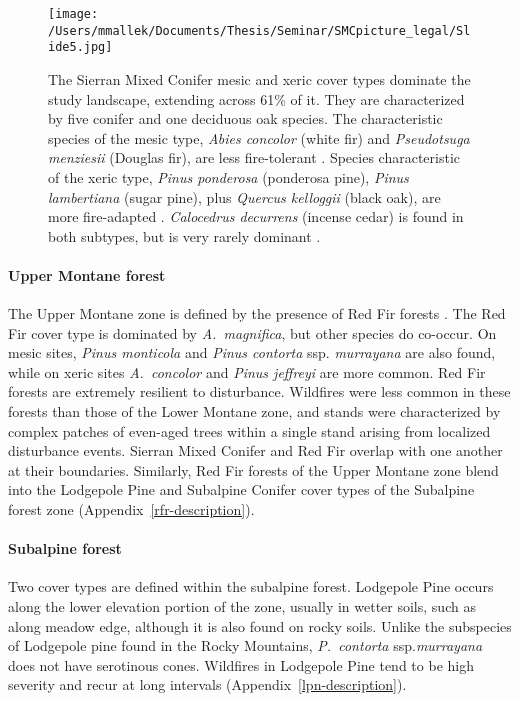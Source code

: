 
\begin{figure}[!htbp]
\centering
\texttt{[image: /Users/mmallek/Documents/Thesis/Seminar/SMCpicture\_legal/Slide5.jpg]}
\caption{The Sierran Mixed Conifer mesic and xeric cover types dominate the study landscape, extending across 61\% of it. They are characterized by five conifer and one deciduous oak species. The characteristic species of the mesic type, \emph{Abies concolor} (white fir) and \emph{Pseudotsuga menziesii} (Douglas fir), are less fire-tolerant \citep{whitefirphoto,dougfirphoto}. Species characteristic of the xeric type, \emph{Pinus ponderosa} (ponderosa pine), \emph{Pinus lambertiana} (sugar pine), plus \emph{Quercus kelloggii} (black oak), are more fire-adapted \citep{ponderosaphoto,sugarpinephoto,blackoakphoto}. \emph{Calocedrus decurrens} (incense cedar) is found in both subtypes, but is very rarely dominant \citep{cedarphoto}.}
\label{fig:smctrees}
\end{figure}


\paragraph*{Upper Montane forest} The Upper Montane zone is defined by the presence of Red Fir forests \citep{Potter1998}. The Red Fir cover type is dominated by \emph{A.~magnifica}, but other species do co-occur. On mesic sites, \emph{Pinus monticola} and \emph{Pinus contorta} ssp. \emph{murrayana} are also found, while on xeric sites \emph{A.~concolor} and \emph{Pinus jeffreyi} are more common. Red Fir forests are extremely resilient to disturbance. Wildfires were less common in these forests than those of the Lower Montane zone, and stands were characterized by complex patches of even-aged trees within a single stand arising from localized disturbance events. Sierran Mixed Conifer and Red Fir overlap with one another at their boundaries. Similarly, Red Fir forests of the Upper Montane zone blend into the Lodgepole Pine and Subalpine Conifer cover types of the Subalpine forest zone (Appendix~\ref{rfr-description}).


\paragraph*{Subalpine forest} Two cover types are defined within the subalpine forest. Lodgepole Pine occurs along the lower elevation portion of the zone, usually in wetter soils, such as along meadow edge, although it is also found on rocky soils. Unlike the subspecies of Lodgepole pine found in the Rocky Mountains, \emph{P.~contorta} ssp.\@ \emph{murrayana} does not have serotinous cones. Wildfires in Lodgepole Pine tend to be high severity and recur at long intervals (Appendix~\ref{lpn-description}).%

